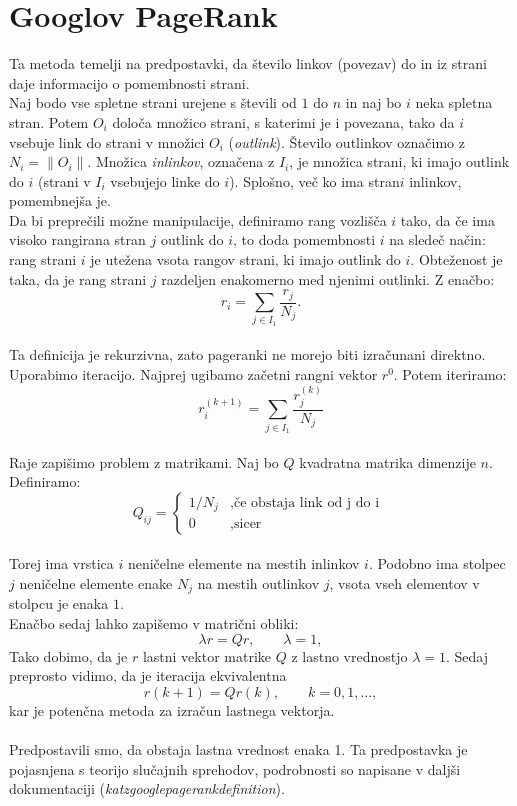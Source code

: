\documentclass[a4paper]{article}
\begin{document}
\section{Googlov PageRank}
\hspace{4.8mm}Ta metoda temelji na predpostavki, da število linkov (povezav)  do in iz strani daje informacijo o pomembnosti strani. \\
Naj bodo vse spletne strani urejene s števili od $1$ do $n$ in naj bo $i$ neka spletna stran. Potem $O_i$ določa množico strani, s katerimi je i povezana, tako da $i$ vsebuje link do strani v množici $O_i$ (\textit{outlink}). Število outlinkov označimo z $N_i = \|O_i\|$. Množica \textit{inlinkov}, označena z $I_i$, je množica strani, ki imajo outlink do $i$ (strani v $I_i$ vsebujejo linke do $i$).
Splošno, več ko ima stran$i$ inlinkov, pomembnejša je. \\  Da bi preprečili možne manipulacije, definiramo rang vozlišča $i$ tako, da če ima visoko rangirana stran $j$ outlink do $i$, to doda pomembnosti $i$ na sledeč način: rang strani $i$ je utežena vsota rangov strani, ki imajo outlink do $i$. Obteženost  je taka, da je rang strani $j$ razdeljen enakomerno med njenimi outlinki. Z enačbo: $$r_i = \sum_{j \in I_1} \frac{r_j}{N_j}.$$ \\
Ta definicija je rekurzivna, zato pageranki ne morejo biti izračunani direktno. Uporabimo iteracijo. Najprej ugibamo začetni rangni vektor $r^0$. Potem iteriramo:
$$r_i^{(k+1)} = \sum_{j \in I_1} \frac{r_j^{(k)}}{N_j}$$ \\
Raje zapišimo problem z matrikami. Naj bo $Q$ kvadratna matrika dimenzije $n$. Definiramo:
\[
Q_{ij} = 
\left \{
	\begin{array}{ll}
		1/N_j  &, \mbox{če obstaja link od j do i }  \\
		0 &, \mbox{sicer} 
	\end{array}
\right. \]
\\
Torej ima vrstica $i$ neničelne elemente na mestih inlinkov $i$. Podobno ima stolpec $j$ neničelne elemente enake $N_j$ na mestih  outlinkov $j$, vsota vseh elementov v stolpcu je enaka $1$. \\
Enačbo sedaj lahko zapišemo v matrični obliki:
$$ \lambda r = Qr,     \qquad \lambda = 1,$$
Tako dobimo, da je $r$ lastni vektor matrike $Q$ z lastno vrednostjo $\lambda = 1$. Sedaj preprosto vidimo, da je iteracija ekvivalentna
$$r{(k+1)} = Qr{(k)},\qquad  k=0,1,… ,$$
kar je potenčna metoda za izračun lastnega vektorja.\\
\\ Predpostavili smo, da obstaja lastna vrednost enaka 1. Ta predpostavka je pojasnjena s teorijo slučajnih sprehodov, podrobnosti so napisane v daljši dokumentaciji (\textit{katzgooglepagerankdefinition}). \\
\end{document}
